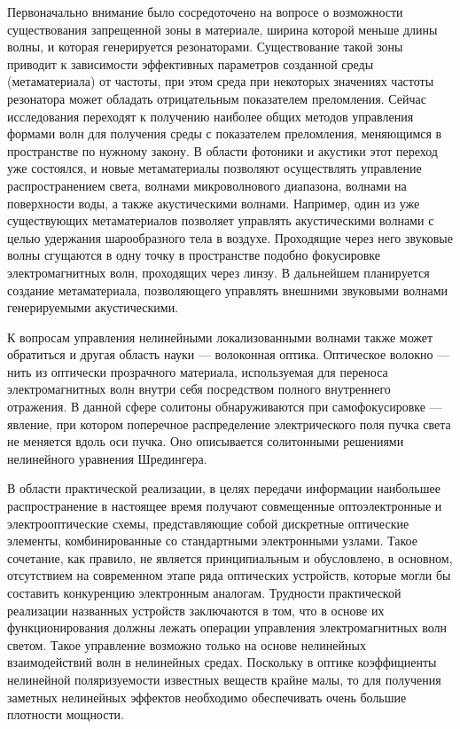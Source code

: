 Первоначально внимание было сосредоточено на вопросе о возможности существования запрещенной зоны в материале, ширина которой меньше длины волны, и которая генерируется резонаторами. Существование такой зоны приводит к зависимости эффективных параметров созданной среды (метаматериала) от частоты, при этом среда при некоторых значениях частоты резонатора может обладать отрицательным показателем преломления. Сейчас исследования переходят к получению наиболее общих методов управления формами волн для получения среды с показателем преломления, меняющимся в пространстве по нужному закону. В области фотоники и акустики этот переход уже состоялся, и новые метаматериалы позволяют осуществлять управление распространением света, волнами микроволнового диапазона, волнами на поверхности воды, а также акустическими волнами. 
Например, один из уже существующих метаматериалов позволяет управлять акустическими волнами с целью удержания шарообразного тела в воздухе. Проходящие через него звуковые волны сгущаются в одну точку в пространстве подобно фокусировке электромагнитных волн, проходящих через линзу. В дальнейшем планируется создание метаматериала, позволяющего управлять внешними звуковыми волнами генерируемыми акустическими.


К вопросам управления нелинейными локализованными волнами также может обратиться и другая область науки --- волоконная оптика. Оптическое волокно --- нить из оптически прозрачного материала, используемая для переноса электромагнитных волн внутри себя посредством полного внутреннего отражения. В данной сфере солитоны обнаруживаются при самофокусировке --- явление, при котором поперечное распределение электрического поля пучка света не меняется вдоль оси пучка. Оно описывается солитонными решениями нелинейного уравнения Шредингера. 

В области практической реализации, в целях передачи информации наибольшее распространение в настоящее время получают совмещенные оптоэлектронные и электрооптические схемы, представляющие собой дискретные оптические элементы, комбинированные со стандартными электронными узлами. Такое сочетание, как правило, не является принципиальным и обусловлено, в основном, отсутствием на современном этапе ряда оптических устройств, которые могли бы составить конкуренцию электронным аналогам. Трудности практической реализации названных устройств заключаются в том, что в основе их функционирования должны лежать операции управления электромагнитных волн светом. Такое управление возможно только на основе нелинейных взаимодействий волн в нелинейных средах. Поскольку в оптике коэффициенты нелинейной поляризуемости известных веществ крайне малы, то для получения заметных нелинейных эффектов необходимо обеспечивать очень большие плотности мощности.

